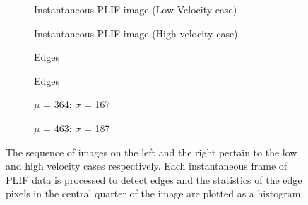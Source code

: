 \begin{figure}

\centering

\hfill
\begin{subfigure}{0.45\linewidth}
  \centering
  
  \caption{Instantaneous PLIF image (Low Velocity case)}
  \label{fig:referenceVelocityLowVelPLIFImage}
\end{subfigure}
\hfill
\begin{subfigure}{0.45\linewidth}
  \centering
  
  \caption{Instantaneous PLIF image (High velocity case)}
  \label{fig:referenceVelocityHighVelPLIFImage}
\end{subfigure}
\hfill

\hfill
\begin{subfigure}{0.45\linewidth}
  \centering
  
  \caption{Edges}
  \label{fig:referenceVelocityLowVelPLIFEdge}
\end{subfigure}
\hfill
\begin{subfigure}{0.45\linewidth}
  \centering
  
  \caption{Edges}
  \label{fig:referenceVelocityHighVelPLIFEdge}
\end{subfigure}
\hfill

\hfill
\begin{subfigure}{0.45\linewidth}
  \centering
  
  \caption{\(\mu\) = 364; \(\sigma\) = 167}
  \label{fig:referenceVelocityLowVelPLIFHistogram}
\end{subfigure}
\hfill
\begin{subfigure}{0.45\linewidth}
  \centering
  
  \caption{\(\mu\) = 463; \(\sigma\) = 187}
  \label{fig:referenceVelocityHighVelPLIFHistogram}
\end{subfigure}
\hfill

\caption[Effect of Reference Velocity on Flame Structure]{The sequence of images on the left and the right pertain to the low and high velocity cases respectively. Each instantaneous frame of PLIF data is processed to detect edges and the statistics of the edge pixels in the central quarter of the image are plotted as a histogram.}

\label{fig:referenceVelocityPLIFResults}

\end{figure}

